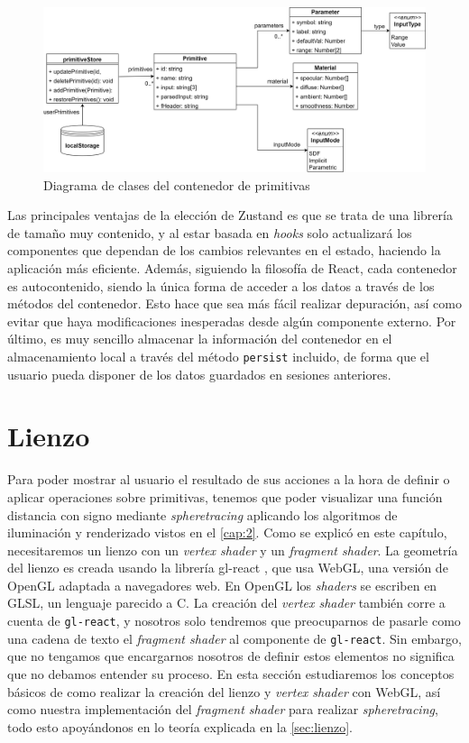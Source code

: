 \begin{figure}[ht!]
    \centering
    \includegraphics[width=\textwidth]{Plantilla-TFG-master/img/diagramaZustand.png}
    \caption{Diagrama de clases del contenedor de primitivas}
    \label{fig:contenedorPrim}
\end{figure}

Las principales ventajas de la elección de Zustand es que se trata de una librería de tamaño muy contenido, y al estar basada en \textit{hooks} solo actualizará los componentes que dependan de los cambios relevantes en el estado, haciendo la aplicación más eficiente. Además, siguiendo la filosofía de React, cada contenedor es autocontenido, siendo la única forma de acceder a los datos a través de los métodos del contenedor. Esto hace que sea más fácil realizar depuración, así como evitar que haya modificaciones inesperadas desde algún componente externo. Por último, es muy sencillo almacenar la información del contenedor en el almacenamiento local a través del método \texttt{persist} incluido, de forma que el usuario pueda disponer de los datos guardados en sesiones anteriores.

\section{Lienzo}\label{sec:lienzoImplem}
Para poder mostrar al usuario el resultado de sus acciones a la hora de definir o aplicar operaciones sobre primitivas, tenemos que poder visualizar una función distancia con signo mediante \textit{spheretracing} aplicando los algoritmos de iluminación y renderizado vistos en el \autoref{cap:2}. Como se explicó en este capítulo, necesitaremos un lienzo con un \textit{vertex shader} y un \textit{fragment shader}. La geometría del lienzo es creada usando la librería gl-react \cite{gl-react}, que usa WebGL, una versión de OpenGL adaptada a navegadores web. En OpenGL los \textit{shaders} se escriben en GLSL, un lenguaje parecido a C. La creación del \textit{vertex shader} también corre a cuenta de \texttt{gl-react}, y nosotros solo tendremos que preocuparnos de pasarle como una cadena de texto el \textit{fragment shader} al componente de \texttt{gl-react}. Sin embargo, que no tengamos que encargarnos nosotros de definir estos elementos no significa que no debamos entender su proceso. En esta sección estudiaremos los conceptos básicos de como realizar la creación del lienzo y \textit{vertex shader} \cite{webgl} con WebGL, así como nuestra implementación del \textit{fragment shader} para realizar \textit{spheretracing}, todo esto apoyándonos en lo teoría explicada en la \autoref{sec:lienzo}.\newline

